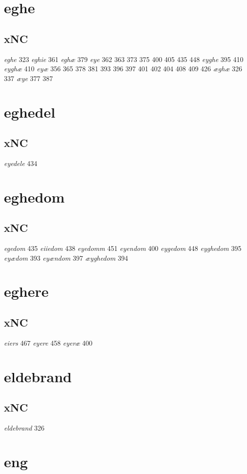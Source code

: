 \documentclass[a4paper,twocolumn]{article}
\begin{document}
\section{eghe}
\label{sec:org8540db4}
\subsection{xNC}
\label{sec:org64ff7f2}
\emph{eghe} 323 \emph{eghie} 361 \emph{eghæ} 379 \emph{eye} 362 363 373 375 400 405 435 448 \emph{eyghe} 395 410 \emph{eyghæ} 410 \emph{eyæ} 356 365 378 381 393 396 397 401 402 404 408 409 426 \emph{æghæ} 326 337 \emph{æye} 377 387 
\section{eghedel}
\label{sec:org24e78fc}
\subsection{xNC}
\label{sec:org4da2c5b}
\emph{eyedele} 434 
\section{eghedom}
\label{sec:org3487ee1}
\subsection{xNC}
\label{sec:org3078b43}
\emph{egedom} 435 \emph{eiiedom} 438 \emph{eyedomm} 451 \emph{eyendom} 400 \emph{eygedom} 448 \emph{eyghedom} 395 \emph{eyædom} 393 \emph{eyændom} 397 \emph{æyghedom} 394 
\section{eghere}
\label{sec:orgf874379}
\subsection{xNC}
\label{sec:org0973aaa}
\emph{eiers} 467 \emph{eyere} 458 \emph{eyeræ} 400 
\section{eldebrand}
\label{sec:org2105633}
\subsection{xNC}
\label{sec:org365ec70}
\emph{eldebrand} 326 
\section{eng}
\label{sec:org753a2af}
\end{document}
